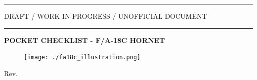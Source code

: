 \begin{titlepage}
\begin{center}
        \vspace*{0.35cm}
        
        \hrule
       	    
        \vspace{.5cm}
        
        \begin{center}
          \small
          \large{
            DRAFT / WORK IN PROGRESS / UNOFFICIAL DOCUMENT
          }        
        \end{center}

        \vspace{.5cm}

        \hrule

        \vspace{1.5cm}

        \begin{center}
          \small
          \LARGE{
            \textbf{POCKET CHECKLIST - F/A-18C HORNET}
          }
        \end{center}

        \vspace{.5cm}

        \begin{figure}[!ht]
          \centering
          \texttt{[image: ./fa18c\_illustration.png]}
          \label{fig:fa18c_illustration}
        \end{figure}

        \vfill
        
        \normalsize
        Rev. \revisionNumber
        
	\end{center}
\end{titlepage}

